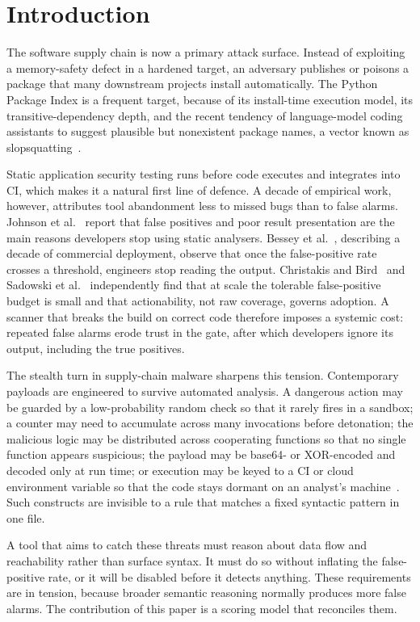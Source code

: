 \documentclass[runningheads]{llncs}
\begin{document}
\section{Introduction}\label{sec:intro}
The software supply chain is now a primary attack surface. Instead of exploiting
a memory-safety defect in a hardened target, an adversary publishes or poisons a
package that many downstream projects install automatically. The Python Package
Index is a frequent target, because of its install-time execution model, its
transitive-dependency depth, and the recent tendency of language-model coding
assistants to suggest plausible but nonexistent package names, a vector known as
slopsquatting~\cite{spracklen,ohm,ladisa,sonatype}.

Static application security testing runs before code executes and integrates
into CI, which makes it a natural first line of defence. A decade of empirical
work, however, attributes tool abandonment less to missed bugs than to false
alarms. Johnson et al.~\cite{johnson} report that false positives and poor
result presentation are the main reasons developers stop using static analysers.
Bessey et al.~\cite{bessey}, describing a decade of commercial deployment,
observe that once the false-positive rate crosses a threshold, engineers stop
reading the output. Christakis and Bird~\cite{christakis} and Sadowski et
al.~\cite{sadowski} independently find that at scale the tolerable false-positive
budget is small and that actionability, not raw coverage, governs adoption. A
scanner that breaks the build on correct code therefore imposes a systemic cost:
repeated false alarms erode trust in the gate, after which developers ignore its
output, including the true positives.

The stealth turn in supply-chain malware sharpens this tension. Contemporary
payloads are engineered to survive automated analysis. A dangerous action may be
guarded by a low-probability random check so that it rarely fires in a sandbox; a
counter may need to accumulate across many invocations before detonation; the
malicious logic may be distributed across cooperating functions so that no single
function appears suspicious; the payload may be base64- or XOR-encoded and
decoded only at run time; or execution may be keyed to a CI or cloud environment
variable so that the code stays dormant on an analyst's machine~\cite{brumley,attack}.
Such constructs are invisible to a rule that matches a fixed syntactic pattern in
one file.

A tool that aims to catch these threats must reason about data flow and
reachability rather than surface syntax. It must do so without inflating the
false-positive rate, or it will be disabled before it detects anything. These
requirements are in tension, because broader semantic reasoning normally produces
more false alarms. The contribution of this paper is a scoring model that
reconciles them.
\end{document}
